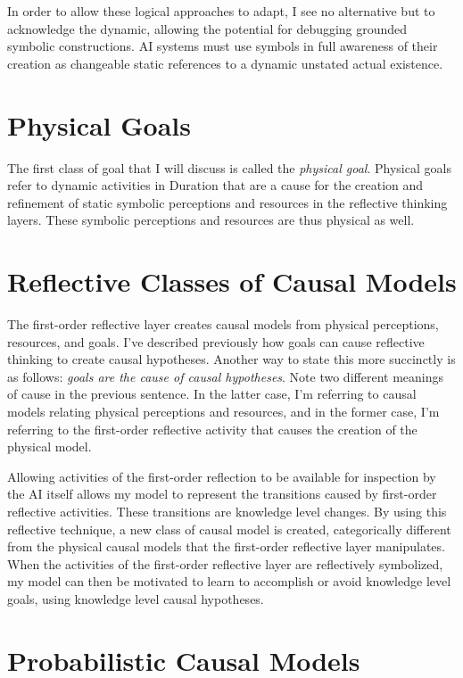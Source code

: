 In order to allow these logical approaches to adapt, I see no
alternative but to acknowledge the dynamic, allowing the potential for
debugging grounded symbolic constructions.  AI systems must use
symbols in full awareness of their creation as changeable static
references to a dynamic unstated actual existence.

\section{Physical Goals}

The first class of goal that I will discuss is called the
\emph{physical goal}.  Physical goals refer to dynamic activities in
Duration that are a cause for the creation and refinement of static
symbolic perceptions and resources in the reflective thinking layers.
These symbolic perceptions and resources are thus physical as well.

\section{Reflective Classes of Causal Models}

The first-order reflective layer creates causal models from physical
perceptions, resources, and goals.  I've described previously how
goals can cause reflective thinking to create causal hypotheses.
Another way to state this more succinctly is as follows: \emph{goals
  are the cause of causal hypotheses}.  Note two different meanings of
cause in the previous sentence.  In the latter case, I'm referring to
causal models relating physical perceptions and resources, and in the
former case, I'm referring to the first-order reflective activity that
causes the creation of the physical model.

Allowing activities of the first-order reflection to be available for
inspection by the AI itself allows my model to represent the
transitions caused by first-order reflective activities.  These
transitions are knowledge level changes.  By using this reflective
technique, a new class of causal model is created, categorically
different from the physical causal models that the first-order
reflective layer manipulates.  When the activities of the first-order
reflective layer are reflectively symbolized, my model can then be
motivated to learn to accomplish or avoid knowledge level goals, using
knowledge level causal hypotheses.

\section{Probabilistic Causal Models}

